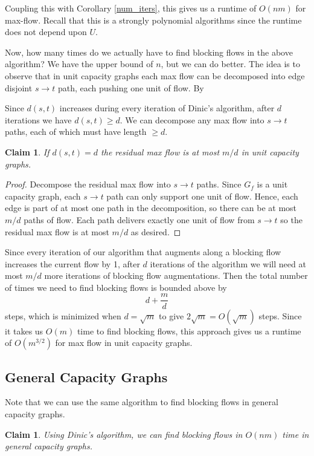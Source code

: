 \documentclass[11pt]{article}
\newtheorem{claim}[theorem]{Claim}
\begin{document}
Coupling this with Corollary \ref{num_iters}, this gives us a runtime of $O(nm)$ for max-flow. Recall that this is a strongly polynomial algorithms since the runtime does not depend upon $U$. 


Now, how many times do we actually have to find blocking flows in the above algorithm? We have the upper bound of $n$, but we can do better. The idea is to observe that in unit capacity graphs each max flow can be decomposed into edge disjoint $s \to t$ path, each pushing one unit of flow. By 

Since $d(s, t)$ increases during every iteration of Dinic's algorithm, after $d$ iterations we have $d(s, t) \geq d $. We can decompose any max flow into $s \to t$ paths, each of which must have length $\geq d$. 

\begin{claim}
If $d(s, t) = d$ the residual max flow is at most $m/d$ in unit capacity graphs. 
\end{claim}
\begin{proof}
Decompose the residual max flow into $s \to t$ paths. Since $G_f$ is a unit capacity graph, each $s \to t$ path can only support one unit of flow. Hence, each edge is part of at most one path in the decomposition, so there can be at most $m/d$ paths of flow. Each path delivers exactly one unit of flow from $s \to t$ so the residual max flow is at most $m/d$ as desired. 
\end{proof}

Since every iteration of our algorithm that augments along a blocking flow increases the current flow by 1, after $d$ iterations of the algorithm we will need at most $m/d$ more iterations of blocking flow augmentations. Then the total number of times we need to find blocking flows is bounded above by
$$
d + \frac{m}{d} 
$$
steps, which is minimized when $d = \sqrt m$ to give $2\sqrt{m} = O(\sqrt{m})$ steps. Since it takes us $O(m)$ time to find blocking flows, this approach gives us a runtime of $O(m^{3/2})$ for max flow in unit capacity graphs. 

\subsection{General Capacity Graphs}
Note that we can use the same algorithm to find blocking flows in general capacity graphs. 

\begin{claim}
Using Dinic's algorithm, we can find blocking flows in $O(nm)$ time in general capacity graphs. 
\end{claim}
\end{document}
